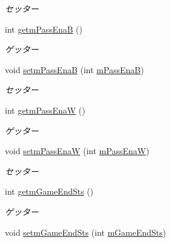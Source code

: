 \begin{DoxyCompactItemize}
\begin{DoxyCompactList}\small\item\em セッター \end{DoxyCompactList}\item 
int \hyperlink{classjp_1_1gr_1_1java__conf_1_1yuta__yoshinaga_1_1reversi_1_1model_1_1_reversi_play_adea2f109ec29c08bcb141f651104388d}{getm\+Pass\+EnaB} ()
\begin{DoxyCompactList}\small\item\em ゲッター \end{DoxyCompactList}\item 
void \hyperlink{classjp_1_1gr_1_1java__conf_1_1yuta__yoshinaga_1_1reversi_1_1model_1_1_reversi_play_ac0c2357bb22b9510db923c023986939f}{setm\+Pass\+EnaB} (int \hyperlink{classjp_1_1gr_1_1java__conf_1_1yuta__yoshinaga_1_1reversi_1_1model_1_1_reversi_play_aec71a4a124cdb7296156a8b592573915}{m\+Pass\+EnaB})
\begin{DoxyCompactList}\small\item\em セッター \end{DoxyCompactList}\item 
int \hyperlink{classjp_1_1gr_1_1java__conf_1_1yuta__yoshinaga_1_1reversi_1_1model_1_1_reversi_play_a73d15ded7c188b5375828b710d89f8b7}{getm\+Pass\+EnaW} ()
\begin{DoxyCompactList}\small\item\em ゲッター \end{DoxyCompactList}\item 
void \hyperlink{classjp_1_1gr_1_1java__conf_1_1yuta__yoshinaga_1_1reversi_1_1model_1_1_reversi_play_abfd46a42f82bd4fd73751d7679427e5e}{setm\+Pass\+EnaW} (int \hyperlink{classjp_1_1gr_1_1java__conf_1_1yuta__yoshinaga_1_1reversi_1_1model_1_1_reversi_play_a20946b56bc96cd1c36d57b882ae2556e}{m\+Pass\+EnaW})
\begin{DoxyCompactList}\small\item\em セッター \end{DoxyCompactList}\item 
int \hyperlink{classjp_1_1gr_1_1java__conf_1_1yuta__yoshinaga_1_1reversi_1_1model_1_1_reversi_play_a3cf8475b71d38f4c656518393eb3aeb6}{getm\+Game\+End\+Sts} ()
\begin{DoxyCompactList}\small\item\em ゲッター \end{DoxyCompactList}\item 
void \hyperlink{classjp_1_1gr_1_1java__conf_1_1yuta__yoshinaga_1_1reversi_1_1model_1_1_reversi_play_afbd1ebc8acf45297e836fad46e2c0e69}{setm\+Game\+End\+Sts} (int \hyperlink{classjp_1_1gr_1_1java__conf_1_1yuta__yoshinaga_1_1reversi_1_1model_1_1_reversi_play_ac5e04218e96e64d587c295cc607ee353}{m\+Game\+End\+Sts})

\end{DoxyCompactItemize}
